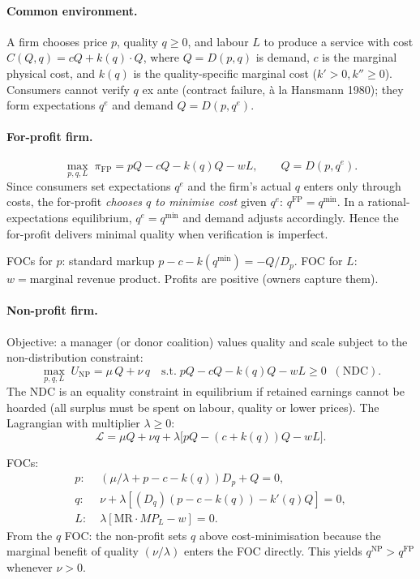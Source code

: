 \documentclass[11pt,a4paper]{article}
\begin{document}
\paragraph{Common environment.}
A firm chooses price $p$, quality $q\ge 0$, and labour $L$ to produce a service with cost $C(Q,q)=cQ+k(q)\cdot Q$, where $Q=D(p,q)$ is demand, $c$ is the marginal physical cost, and $k(q)$ is the quality-specific marginal cost ($k'>0,k''\ge 0$). Consumers cannot verify $q$ ex ante (contract failure, à la Hansmann 1980); they form expectations $q^{e}$ and demand $Q=D(p,q^{e})$.

\paragraph{For-profit firm.}
\begin{equation}
\max_{p,q,L}\;\pi_{\mathrm{FP}}=pQ-cQ-k(q)Q-wL,\qquad Q=D(p,q^{e}).
\label{eq:q5_FP}
\end{equation}
Since consumers set expectations $q^{e}$ and the firm's actual $q$ enters only through costs, the for-profit \emph{chooses $q$ to minimise cost} given $q^{e}$: $q^{\mathrm{FP}}=q^{\min}$. In a rational-expectations equilibrium, $q^{e}=q^{\min}$ and demand adjusts accordingly. Hence the for-profit delivers minimal quality when verification is imperfect.

FOCs for $p$: standard markup $p-c-k(q^{\min})=-Q/D_{p}$. FOC for $L$: $w=\text{marginal revenue product}$. Profits are positive (owners capture them).

\paragraph{Non-profit firm.}
Objective: a manager (or donor coalition) values quality and scale subject to the non-distribution constraint:
\begin{equation}
\max_{p,q,L}\;U_{\mathrm{NP}}=\mu\,Q+\nu\,q\quad \text{s.t.}\; pQ-cQ-k(q)Q-wL\ge 0\;\;(\text{NDC}).
\label{eq:q5_NP}
\end{equation}
The NDC is an equality constraint in equilibrium if retained earnings cannot be hoarded (all surplus must be spent on labour, quality or lower prices). The Lagrangian with multiplier $\lambda\ge 0$:
\[
\mathcal{L}=\mu Q+\nu q+\lambda\bigl[pQ-(c+k(q))Q-wL\bigr].
\]

FOCs:
\begin{align*}
p:\;& (\mu/\lambda+p-c-k(q))D_{p}+Q=0,\\
q:\;& \nu+\lambda[(D_{q})(p-c-k(q))-k'(q)Q]=0,\\
L:\;& \lambda[\mathrm{MR}\cdot MP_{L}-w]=0.
\end{align*}
From the $q$ FOC: the non-profit sets $q$ above cost-minimisation because the marginal benefit of quality $(\nu/\lambda)$ enters the FOC directly. This yields $q^{\mathrm{NP}}>q^{\mathrm{FP}}$ whenever $\nu>0$.
\end{document}
